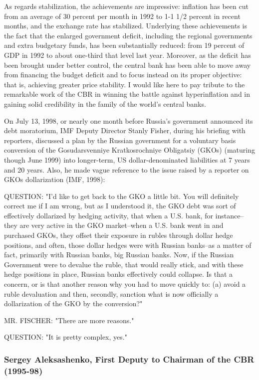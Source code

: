As regards stabilization, the achievements are impressive: inflation has been cut from an average of 30 percent per month in 1992 to 1-1 1/2 percent in recent months, and the exchange rate has stabilized. Underlying these achievements is the fact that the enlarged government deficit, including the regional governments and extra budgetary funds, has been substantially reduced: from 19 percent of GDP in 1992 to about one-third that level last year. Moreover, as the deficit has been brought under better control, the central bank has been able to move away from financing the budget deficit and to focus instead on its proper objective: that is, achieving greater price stability. I would like here to pay tribute to the remarkable work of the CBR in winning the battle against hyperinflation and in gaining solid credibility in the family of the world's central banks.

On July 13, 1998, or nearly one month before Russia's government announced its debt moratorium, IMF Deputy Director Stanly Fisher, during his briefing with reporters, discussed a plan by the Russian government for a voluntary basis conversion of the Gosudarsvenniye Kratkosrochniye Obligatsiy (GKOs) (maturing though June 1999) into longer-term, US dollar-denominated liabilities at 7 years and 20 years. Also, he made vague reference to the issue raised by a reporter on GKOs dollarization (IMF, 1998):

QUESTION: "I'd like to get back to the GKO a little bit. You will definitely correct me if I am wrong, but as I understood it, the GKO debt was sort of effectively dollarized by hedging activity, that when a U.S. bank, for instance--they are very active in the GKO market--when a U.S. bank went in and purchased GKOs, they offset their exposure in rubles through dollar hedge positions, and often, those dollar hedges were with Russian banks--as a matter of fact, primarily with Russian banks, big Russian banks. Now, if the Russian Government were to devalue the ruble, that would really stick, and with these hedge positions in place, Russian banks effectively could collapse. Is that a concern, or is that another reason why you had to move quickly to: (a) avoid a ruble devaluation and then, secondly, sanction what is now officially a dollarization of the GKO by the conversion?" 

MR. FISCHER: "There are more reasons." 

QUESTION: "It is pretty complex, yes." 

\subsubsection{Sergey Aleksashenko, First Deputy to Chairman of the CBR (1995-98)}

